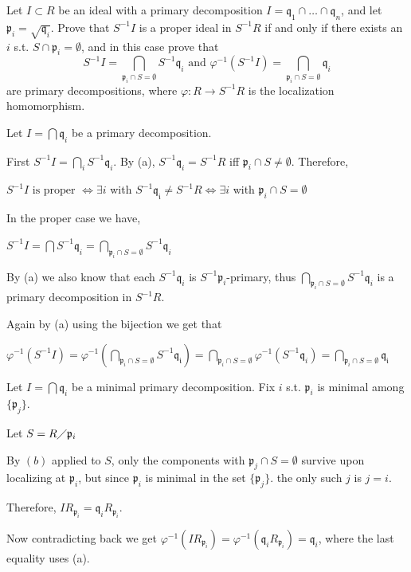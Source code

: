 \documentclass[12pt, letterpaper]{article}
\newcommand{\p}{\mathfrak{p}}
\renewcommand{\t}[1]{\text{#1}}
\newcommand{\mf}[1]{\mathfrak{#1}}
\begin{document}
\begin{subproblem}{}
    Let $I \subset R$ be an ideal with a primary decomposition $I = \mf{q}_1 \cap \dots \cap \mf{q}_n$, and let $\p_i = \sqrt{\mf{q}_i}$.
    Prove that $S^{-1}I$ is a proper ideal in $S^{-1}R$ if and only if there exists an $i$ s.t. $S \cap \p_i = \emptyset$, and in this case prove that
    \[S^{-1}I = \bigcap_{\p_i \cap S = \emptyset} S^{-1}\mf{q}_i \t{ and } \varphi^{-1}(S^{-1}I) = \bigcap_{\p_i \cap S = \emptyset} \mf{q}_i\]
    are primary decompositions, where $\varphi: R \to S^{-1}R$ is the localization homomorphism.
\end{subproblem}
\begin{problemproof}
    Let $I=\bigcap \mf{q}_i$ be a primary decomposition.

    First $S^{-1}I = \bigcap_i S^{-1}\mf{q}_i$. By (a), $S^{-1}\mf{q}_i=S^{-1}R$ iff $\p_i \cap S \neq \emptyset$. Therefore,

    $S^{-1}I \t{ is proper } \iff \exists i$ with $S^{-1}\mf{q_i} \neq S^{-1}R \iff \exists i$ with $\p_i \cap S = \emptyset$

    In the proper case we have,

    $S^{-1}I = \bigcap S^{-1}\mf{q}_i = \bigcap_{\p_i \cap S = \emptyset} S^{-1}\mf{q}_i$

    By (a) we also know that each $S^{-1}\mf{q}_i$ is $S^{-1}\p_i$-primary, thus $\bigcap_{\p_i \cap S = \emptyset} S^{-1}\mf{q}_i$ is a primary decomposition in $S^{-1}R$.

    Again by (a) using the bijection we get that

    $\varphi^{-1}(S^{-1}I)=\varphi^{-1}\left( \bigcap_{\p_i \cap S = \emptyset} S^{-1}\mf{q_i} \right) = \bigcap_{\p_i \cap S = \emptyset} \varphi^{-1}(S^{-1}\mf{q}_i)=\bigcap_{\p_i \cap S = \emptyset} \mf{q_i}$
\end{problemproof}

\begin{subproblem}{}
    
\end{subproblem}
\begin{problemproof}
    Let $I = \bigcap \mf{q}_i$ be a minimal primary decomposition. Fix $i$ s.t. $\p_i$ is minimal among $\{\p_j\}$.

    Let $S = R \diagup \p_i$

    By $(b)$ applied to $S$, only the components with $\p_j \cap S = \emptyset$ survive upon localizing at $\p_i$, but since $\p_i$ is minimal in the set $\{\p_j\}$. the only such $j$ is $j=i$.

    Therefore, $I R_{\p_i} = \mf{q}_i R_{\p_i}$.

    Now contradicting back we get $\varphi^{-1}(I R_{\p_i}) = \varphi^{-1}(\mf{q}_i R_{\p_i}) = \mf{q}_i$, where the last equality uses (a).
\end{problemproof}
\end{document}
